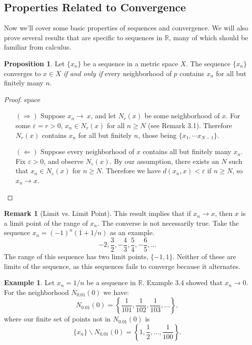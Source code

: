 \documentclass{article}
\newcommand{\R}{\mathbb{R}}
\theoremstyle{definition}
\newtheorem{proposition}{Proposition}[section]
\newtheorem{example}{Example}[section]
\newtheorem{remark}{Remark}[section]
\begin{document}
\subsection{Properties Related to Convergence}
Now we'll cover some basic properties of sequences and convergence. We will also prove several results that are specific to sequences in $ \R $, many of which should be familiar from calculus. 
\begin{proposition}
	Let $ \{x_n\} $ be a sequence in a metric space $ X $. The sequence $ \{x_n\} $ converges to $ x\in X $ \textit{if and only if} every neighborhood of $ p $ contains $ x_n $ for all but finitely many $ n $.  
\end{proposition}
\begin{proof}{\color{white}space}
	\begin{enumerate}
		\item [$ (\Longrightarrow) $] Suppose $ x_n\to\ x $, and let $ N_r(x) $ be some neighborhood of $ x $. For some $ \varepsilon=r>0 $, $ x_n\in N_r(x) $ for all $ n\ge N $ (see Remark 3.1). Therefore $ N_r(x) $ contains $ x_n $ for all but finitely $ n $, those being $ \{x_1,\cdots x_{N-1}\} $.  
		\item [$ (\Longleftarrow) $] Suppose every neighborhood of $ x $ contains all but finitely many $ x_n $. Fix $ \varepsilon >0 $, and observe $ N_\varepsilon(x) $. By our assumption, there exists an $ N $ such that $ x_n\in N_\varepsilon(x) $ for $ n\ge N $. Therefore we have $ d(x_n,x)<\varepsilon $ if $ n\ge N $, so $ x_n\to x $.   
	\end{enumerate}
\end{proof}
\begin{remark}[Limit vs. Limit Point]
	This result implies that if $ x_n\to x $, then $ x $ is a limit point of the range of $ x_n $. The converse is not necessarily true. Take the sequence $ x_n=(-1)^n(1+1/n) $ as an example. $$-2, \frac{3}{2}, -\frac{4}{3},\frac{5}{4},-\frac{6}{5},\ldots $$ The range of this sequence has two limit points, $ \{-1,1\} $. Neither of these are limits of the sequence, as this sequences fails to converge because it alternates. 
\end{remark}
\begin{example}
Let $ x_n=1/n $ be a sequence in $ \R $. Example 3.4 showed that $ x_n\to 0 $. For the neighborhood $ N_{0.01}(0) $ we have: $$ N_{0.01}(0)=\left\{\frac{1}{101},\frac{1}{102},\frac{1}{103},\ldots\right\}, $$ where our finite set of points not in $ N_{0.01}(0) $ is $$\{x_n\}\backslash N_{0.01}(0)=\left\{1,\frac{1}{2},\ldots, \frac{1}{100}\right\}.$$
\end{example}
\end{document}
